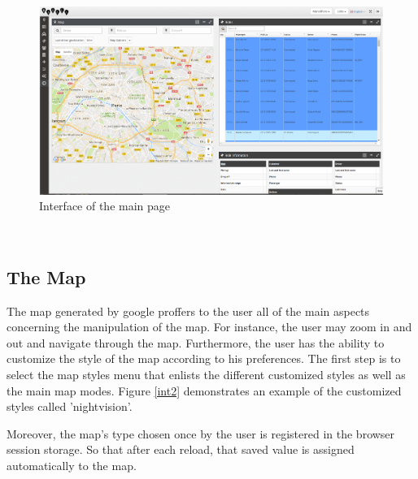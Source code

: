 \begin{figure}[!htbp] 
\begin{center}
\includegraphics[width=6.6 in , height=4.5 in]{images/achievement/0.png}
\caption{Interface of the main page}
\label{int0}
\end{center}
\end{figure}~


\subsection{The Map }

The map generated by google proffers to the user all of the main aspects concerning the manipulation of the map. For instance, the user may zoom in and out and navigate through the map.
Furthermore, the user has the ability to customize the style of the map according to his preferences. The first step is to select the map styles menu that enlists the different customized styles as well as the main map modes. Figure  \ref{int2} demonstrates an example of the customized styles called 'nightvision'.

Moreover, the map's type chosen once by the user is registered in the browser session storage. So that after each reload, that saved value is assigned automatically to the map.


